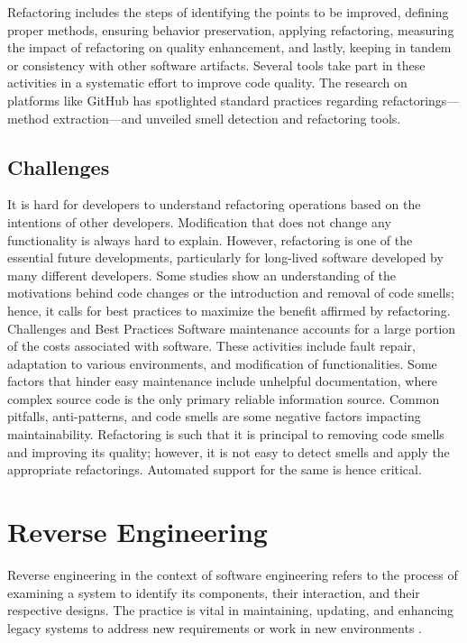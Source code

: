 Refactoring includes the steps of identifying the points to be improved, defining proper methods, ensuring behavior preservation, applying refactoring, measuring the impact of refactoring on quality enhancement, and lastly, keeping in tandem or consistency with other software artifacts. Several tools take part in these activities in a systematic effort to improve code quality. The research on platforms like GitHub has spotlighted standard practices regarding refactorings—method extraction—and unveiled smell detection and refactoring tools.

\subsection{Challenges}

It is hard for developers to understand refactoring operations based on the intentions of other developers. Modification that does not change any functionality is always hard to explain. However, refactoring is one of the essential future developments, particularly for long-lived software developed by many different developers. Some studies show an understanding of the motivations behind code changes or the introduction and removal of code smells; hence, it calls for best practices to maximize the benefit affirmed by refactoring. Challenges and Best Practices Software maintenance accounts for a large portion of the costs associated with software. These activities include fault repair, adaptation to various environments, and modification of functionalities. Some factors that hinder easy maintenance include unhelpful documentation, where complex source code is the only primary reliable information source. Common pitfalls, anti-patterns, and code smells are some negative factors impacting maintainability. Refactoring is such that it is principal to removing code smells and improving its quality; however, it is not easy to detect smells and apply the appropriate refactorings. Automated support for the same is hence critical.

\section{Reverse Engineering}

Reverse engineering in the context of software engineering refers to the process of examining a system to identify its components, their interaction, and their respective designs. The practice is vital in maintaining, updating, and enhancing legacy systems to address new requirements or work in new environments \cite{ReverseEngineering2011}.


